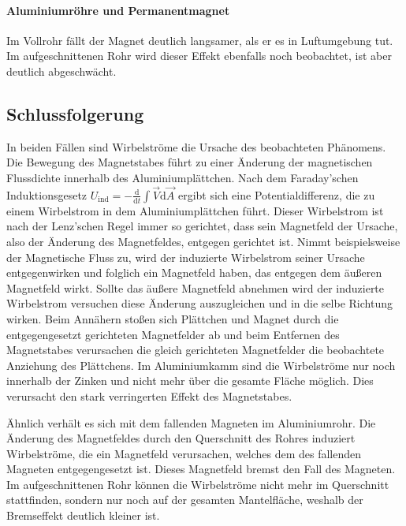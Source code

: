 \documentclass[
	a4paper,
	12pt,
	pagesize,
	ngerman
]{scrartcl}
\begin{document}
	\paragraph{Aluminiumröhre und Permanentmagnet}
	Im Vollrohr fällt der Magnet deutlich langsamer, als er es in Luftumgebung tut. Im aufgeschnittenen Rohr wird dieser Effekt ebenfalls noch beobachtet, ist aber deutlich abgeschwächt.
	\subsection{Schlussfolgerung}
	In beiden Fällen sind Wirbelströme die Ursache des beobachteten Phänomens.
	Die Bewegung des Magnetstabes führt zu einer Änderung der magnetischen Flussdichte innerhalb des Aluminiumplättchen. Nach dem Faraday'schen Induktionsgesetz $U_\text{ind}= - \frac{\text{d}}{\text{d}t} \int \vec{V} \text{d} \vec{A}$ ergibt sich eine Potentialdifferenz, die zu einem Wirbelstrom in dem Aluminiumplättchen führt. Dieser Wirbelstrom ist nach der Lenz'schen Regel immer so gerichtet, dass sein Magnetfeld der Ursache, also der Änderung des Magnetfeldes, entgegen gerichtet ist. Nimmt beispielsweise der Magnetische Fluss zu, wird der induzierte Wirbelstrom seiner Ursache entgegenwirken und folglich ein Magnetfeld haben, das entgegen dem äußeren Magnetfeld wirkt. Sollte das äußere Magnetfeld abnehmen wird der induzierte Wirbelstrom versuchen diese Änderung auszugleichen und in die selbe Richtung wirken. 
	Beim Annähern stoßen sich Plättchen und Magnet durch die entgegengesetzt gerichteten Magnetfelder ab und beim Entfernen des Magnetstabes verursachen die gleich gerichteten Magnetfelder die beobachtete Anziehung des Plättchens.
	Im Aluminiumkamm sind die Wirbelströme nur noch innerhalb der Zinken und nicht mehr über die gesamte Fläche möglich. Dies verursacht den stark verringerten Effekt des Magnetstabes. \par
	Ähnlich verhält es sich mit dem fallenden Magneten im Aluminiumrohr. Die Änderung des Magnetfeldes durch den Querschnitt des Rohres induziert Wirbelströme, die ein Magnetfeld verursachen, welches dem des fallenden Magneten entgegengesetzt ist. Dieses Magnetfeld bremst den Fall des Magneten. Im aufgeschnittenen Rohr können die Wirbelströme nicht mehr im Querschnitt stattfinden, sondern nur noch auf der gesamten Mantelfläche, weshalb der Bremseffekt deutlich kleiner ist. %
\end{document}

